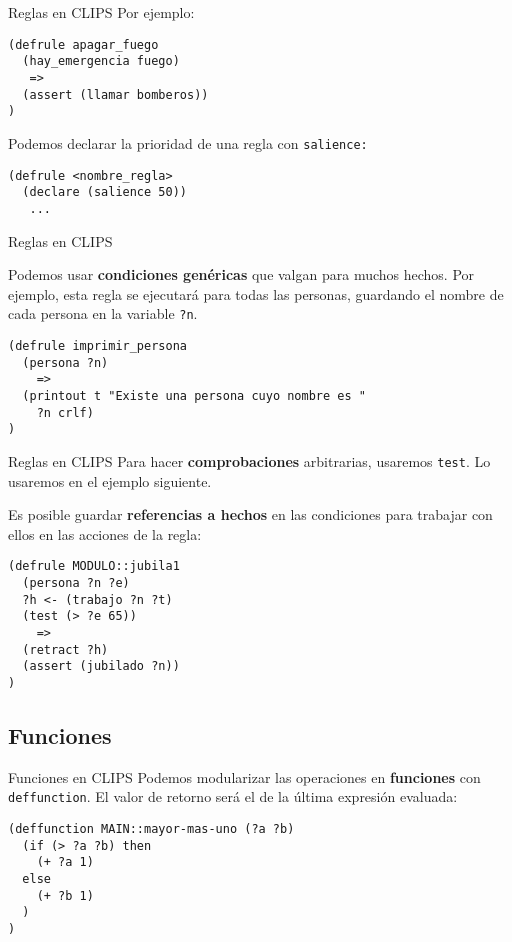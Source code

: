 \documentclass[smaller,spanish,xcolor=svgnames]{beamer}
\begin{document}
\begin{frame}[fragile]{Reglas en CLIPS}
Por ejemplo:
\begin{verbatim}
(defrule apagar_fuego
  (hay_emergencia fuego)
   =>
  (assert (llamar bomberos))
)
\end{verbatim}  

Podemos declarar la prioridad de una regla con \texttt{salience:}

\begin{verbatim}
(defrule <nombre_regla>
  (declare (salience 50))
   ...
\end{verbatim}    
\end{frame}

\begin{frame}[fragile]{Reglas en CLIPS}

Podemos usar \textbf{condiciones genéricas} que valgan para muchos
hechos. Por ejemplo, esta regla se ejecutará para todas las personas, guardando
el nombre de cada persona en la variable \texttt{?n}.

\begin{verbatim}
(defrule imprimir_persona
  (persona ?n)
    =>
  (printout t "Existe una persona cuyo nombre es " 
    ?n crlf)
)
\end{verbatim}
\end{frame}

\begin{frame}[fragile]{Reglas en CLIPS}
  Para hacer \textbf{comprobaciones} arbitrarias, usaremos \texttt{test}. Lo usaremos en
  el ejemplo siguiente.

  \medskip

  Es posible guardar \textbf{referencias a hechos} en las condiciones para trabajar con
  ellos en las acciones de la regla:

\begin{verbatim}
(defrule MODULO::jubila1
  (persona ?n ?e)
  ?h <- (trabajo ?n ?t)
  (test (> ?e 65))
    =>
  (retract ?h)
  (assert (jubilado ?n))
)
\end{verbatim}  
\end{frame}

\subsection{Funciones}

\begin{frame}[fragile]{Funciones en CLIPS}
  Podemos modularizar las operaciones en \textbf{funciones} con \texttt{deffunction}. El
  valor de retorno será el de la última expresión evaluada:

\begin{verbatim}
(deffunction MAIN::mayor-mas-uno (?a ?b)
  (if (> ?a ?b) then
    (+ ?a 1)
  else
    (+ ?b 1)
  )
)
\end{verbatim}
\end{frame}
\end{document}
